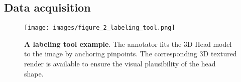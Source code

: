 \documentclass[10pt,twocolumn,letterpaper]{article}
\begin{document}
\begin{comment}
Creating a large-scale dataset with consistent 3D Dense Head Alignment annotations is a highly non-trivial, labor-intensive, and ambiguous problem. 
Creating ground truth labels for 2D images requires using specific equipment which doesn't scale to real-world problems. 
Without using specific equipment or sensors, human annotators can not label the depth or $Z$-coordinate for the image. 
The manual labeling of 2D landmarks on large-pose faces is tedious since the occluded landmarks have to be "guessed", which is impossible for most people. 
As a result, most available datasets and benchmarks contain images in medium poses or annotate only visible landmarks for side and mid poses. 
Most datasets also divide landmarks into static (eyes, nose, lips) and dynamic - visible jaw boundary to simplify the labeling task and increase the consistency of the labels. 
This adds profound ambiguity to the 3D head reconstruction from 2D landmarks as the visible landmarks are not consistent with the 3D head model. 
As an experiment of labeling consistency, we let ten different annotators label an image of 45 yaws for both visible and 3D consistent landmarks (result in a figure). 
The average consistency - [number here, expected to be low].
\end{comment}

\subsection{Data acquisition}\label{ssec:labeling}

\begin{figure}[htp!]\centering
\texttt{[image: images/figure\_2\_labeling\_tool.png]}
\caption{\textbf{A labeling tool example}. The annotator fits the 3D Head model to the image by anchoring pinpoints. 
The corresponding 3D textured render is available to ensure the visual plausibility of the head shape.}
  \vspace{-1em}
  \label{fig:labeling_tool}
\end{figure}
\end{document}
